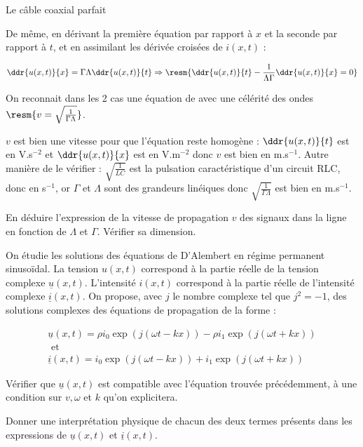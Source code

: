 \begin{exo}[PC][1][devoir]{Le câble coaxial parfait}
\begin{quest}
{  De même, en dérivant la première équation par rapport à $x$ et la seconde par rapport à $t$, et en assimilant les dérivée croisées de $i(x,t)$ :

  $$\ddr{u(x,t)}{x}=\Gamma \Lambda \ddr{u(x,t)}{t}\Rightarrow \resm{\ddr{u(x,t)}{t}-\frac{1}{\Lambda\Gamma}\ddr{u(x,t)}{x}=0}$$

  On reconnait dans les 2 cas une équation de  avec une célérité des ondes $\resm{v=\sqrt{\frac{1}{\Gamma \Lambda}}}$.

  $v$ est bien une vitesse pour que l'équation reste homogène : $\ddr{u(x,t)}{t}$ est en V.s$^{-2}$ et $\ddr{u(x,t)}{x}$ est en V.m$^{-2}$ donc $v$ est bien en m.s$^{-1}$. Autre manière de le vérifier : $\sqrt{\frac{1}{LC}}$ est la pulsation caractéristique d'un circuit RLC, donc en s$^{-1}$, or $\Gamma$ et $\Lambda$ sont des grandeurs linéiques donc $\sqrt{\frac{1}{\Gamma \Lambda}}$ est bien en m.s$^{-1}$.
  }

  En déduire l'expression de la vitesse de propagation ${v}$ des signaux dans la ligne en fonction de $\Lambda$ et $\Gamma$. Vérifier sa dimension.
  \item On étudie les solutions des équations de D'Alembert en régime permanent sinusoïdal. La tension $u(x, t)$ correspond à la partie réelle de la tension complexe $\underline{u}(x, t)$. L'intensité $i(x, t)$ correspond à la partie réelle de l'intensité complexe $\underline{i}(x, t)$. On propose, avec $j$ le nombre complexe tel que $j^{2}=-1$, des solutions complexes des équations de propagation de la forme :

  $$
  \begin{gathered}
    \underline{u}(x, t)=\rho  i_{0}  \exp (j(\omega  t-k  x))-\rho  i_{1}  \exp (j(\omega  t+k  x)) \\
    \text { et } \\
    \underline{i}(x, t)=i_{0}  \exp (j(\omega  t-k  x))+i_{1}  \exp (j(\omega  t+k  x))
  \end{gathered}
  $$

  Vérifier que $\underline{u}(x, t)$ est compatible avec l'équation trouvée précédemment, à une condition sur $v, \omega$ et $k$ qu'on explicitera.

  Donner une interprétation physique de chacun des deux termes présents dans les expressions de $\underline{u}(x, t)$ et $\underline{i}(x, t)$.
\end{quest}
\end{exo}
